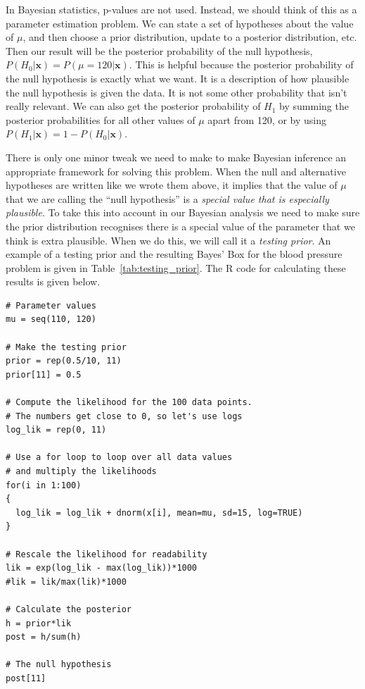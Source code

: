 In Bayesian statistics, p-values are not used. Instead, we should think of this
as a parameter estimation problem. We can state a set of hypotheses about the
value of $\mu$, and then choose a prior distribution, update to a posterior
distribution, etc. Then our result will be the posterior probability of the
null hypothesis, $P(H_0 | \boldsymbol{x}) = P(\mu = 120 | \boldsymbol{x})$.
This is helpful because the posterior probability of the null hypothesis is
exactly what we want. It is a description of how plausible the null hypothesis
is given the data. It is not some other probability that isn't really relevant.
We can also get the posterior probability of $H_1$ by summing the posterior
probabilities for all other values of $\mu$ apart from 120, or by using
$P(H_1 | \boldsymbol{x}) = 1 - P(H_0 | \boldsymbol{x})$.

There is only one minor tweak we need to make to make Bayesian inference an
appropriate framework for solving this problem. When the null and alternative
hypotheses are written like we wrote them above, it implies that the value of $\mu$
that we are calling the ``null hypothesis'' is a {\it special value that is
especially plausible}. To take this into account in our Bayesian analysis we
need to make sure the prior distribution recognises there is a special
value of the parameter that we think is extra plausible. When we do this, we
will call it a {\it testing prior}. An example of a testing prior and the
resulting Bayes' Box for
the blood pressure problem is given in Table~\ref{tab:testing_prior}.
The R code for calculating these results is given below.

\begin{verbatim}
# Parameter values
mu = seq(110, 120)

# Make the testing prior
prior = rep(0.5/10, 11)
prior[11] = 0.5

# Compute the likelihood for the 100 data points.
# The numbers get close to 0, so let's use logs
log_lik = rep(0, 11)

# Use a for loop to loop over all data values
# and multiply the likelihoods
for(i in 1:100)
{
  log_lik = log_lik + dnorm(x[i], mean=mu, sd=15, log=TRUE)
}

# Rescale the likelihood for readability
lik = exp(log_lik - max(log_lik))*1000
#lik = lik/max(lik)*1000

# Calculate the posterior
h = prior*lik
post = h/sum(h)

# The null hypothesis
post[11]
\end{verbatim}



